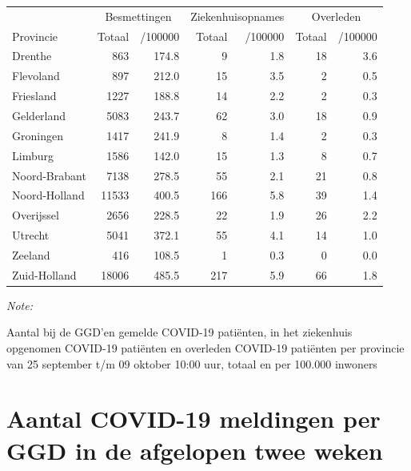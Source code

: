 \documentclass[
  english,
  man,floatsintext]{apa6}
\begin{document}
\begin{table}[H]
\centering
\begin{threeparttable}
\begin{tabular}{lrrrrrr}
\toprule
\multicolumn{1}{c}{ } & \multicolumn{2}{c}{Besmettingen} & \multicolumn{2}{c}{Ziekenhuisopnames} & \multicolumn{2}{c}{Overleden} \\
\cmidrule(l{3pt}r{3pt}){2-3} \cmidrule(l{3pt}r{3pt}){4-5} \cmidrule(l{3pt}r{3pt}){6-7}
Provincie & Totaal & /100000 & Totaal & /100000 & Totaal & /100000\\
\midrule
Drenthe & 863 & 174.8 & 9 & 1.8 & 18 & 3.6\\
Flevoland & 897 & 212.0 & 15 & 3.5 & 2 & 0.5\\
Friesland & 1227 & 188.8 & 14 & 2.2 & 2 & 0.3\\
Gelderland & 5083 & 243.7 & 62 & 3.0 & 18 & 0.9\\
Groningen & 1417 & 241.9 & 8 & 1.4 & 2 & 0.3\\
Limburg & 1586 & 142.0 & 15 & 1.3 & 8 & 0.7\\
Noord-Brabant & 7138 & 278.5 & 55 & 2.1 & 21 & 0.8\\
Noord-Holland & 11533 & 400.5 & 166 & 5.8 & 39 & 1.4\\
Overijssel & 2656 & 228.5 & 22 & 1.9 & 26 & 2.2\\
Utrecht & 5041 & 372.1 & 55 & 4.1 & 14 & 1.0\\
Zeeland & 416 & 108.5 & 1 & 0.3 & 0 & 0.0\\
Zuid-Holland & 18006 & 485.5 & 217 & 5.9 & 66 & 1.8\\
\bottomrule
\end{tabular}
\begin{tablenotes}
\item \textit{Note: } 
\item Aantal bij de GGD’en gemelde COVID-19 patiënten, in het ziekenhuis opgenomen COVID-19 patiënten en overleden COVID-19 patiënten per provincie van 25 september t/m 09 oktober 10:00 uur, totaal en per 100.000 inwoners
\end{tablenotes}
\end{threeparttable}
\end{table}

\newpage

\hypertarget{aantal-covid-19-meldingen-per-ggd-in-de-afgelopen-twee-weken}{%
\section{Aantal COVID-19 meldingen per GGD in de afgelopen twee weken}\label{aantal-covid-19-meldingen-per-ggd-in-de-afgelopen-twee-weken}}
\end{document}
